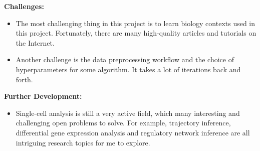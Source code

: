 \documentclass[a4paper, 12pt]{article}
\begin{document}
\textbf{Challenges:}

\begin{itemize}
    \item The most challenging thing in this project is to learn biology contexts used in this project. Fortunately, there are many high-quality articles and tutorials on the Internet.
    \item Another challenge is the data preprocessing workflow and the choice of hyperparameters for some algorithm. It takes a lot of iterations back and forth.
\end{itemize}

\textbf{Further Development:}

\begin{itemize}
    \item Single-cell analysis is still a very active field, which many interesting and challenging open problems to solve. For example, trajectory inference, differential gene expression analysis and regulatory network inference are all intriguing research topics for me to explore.
\end{itemize}
\end{document}

